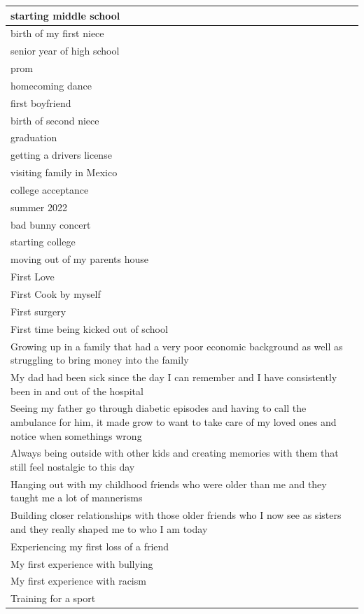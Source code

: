 \documentclass[
  .7em,
  letterpaper,
  DIV=11,
  numbers=noendperiod]{scrartcl}
\begin{document}
\begin{table}
\begin{tabular}{l}
\hline
starting middle school\\
\hline
birth of my first niece\\
\hline
senior year of high school\\
\hline
prom\\
\hline
homecoming dance\\
\hline
first boyfriend\\
\hline
birth of second niece\\
\hline
graduation\\
\hline
getting a drivers license\\
\hline
visiting family in Mexico\\
\hline
college acceptance\\
\hline
summer 2022\\
\hline
bad bunny concert\\
\hline
starting college\\
\hline
moving out of my parents house\\
\hline
First Love\\
\hline
First Cook by myself\\
\hline
First surgery\\
\hline
First time being kicked out of school\\
\hline
Growing up in a family that had a very poor economic background as well as struggling to bring money into the family\\
\hline
My dad had been sick since the day I can remember and I have consistently been in and out of the hospital\\
\hline
Seeing my father go through diabetic episodes and having to call the ambulance for him, it made grow to want to take care of my loved ones and notice when somethings wrong\\
\hline
Always being outside with other kids and creating memories with them that still feel nostalgic to this day\\
\hline
Hanging out with my childhood friends who were older than me and they taught me a lot of mannerisms\\
\hline
Building closer relationships with those older friends who I now see as sisters and they really shaped me to who I am today\\
\hline
Experiencing my first loss of a friend\\
\hline
My first experience with bullying\\
\hline
My first experience with racism\\
\hline
Training for a sport\\

\end{tabular}
\end{table}
\end{document}
